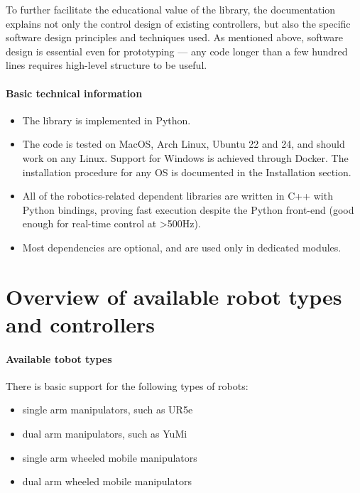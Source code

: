 To further facilitate the educational value
of the library, the documentation explains not only
the control design of existing controllers, but also
the specific software design principles and techniques used.
As mentioned above, software design is essential even for prototyping ---
any code longer than a few hundred lines requires high-level structure
to be useful.

\paragraph{Basic technical information}
\begin{itemize}
\item The library is implemented in Python.
\item The code is tested on MacOS, Arch Linux, Ubuntu 22 and 24, and should work on any Linux. Support for Windows is achieved
 through Docker. The installation procedure for any OS
is documented in the Installation section.
\item All of the robotics-related dependent libraries are written in C++ with Python bindings, proving fast execution despite the Python front-end
		(good enough for real-time control at >500Hz).
\item Most dependencies are optional, and are used only in
	dedicated modules.
\end{itemize}

\section{Overview of available robot types and controllers}

\paragraph{Available tobot types}
There is basic support for the following types of robots:
\begin{itemize}
		\item single arm manipulators, such as UR5e
		\item dual arm manipulators, such as YuMi
		\item single arm wheeled mobile manipulators
		\item dual arm wheeled mobile manipulators
\end{itemize}
